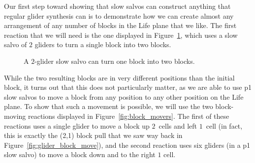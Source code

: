 Our first step toward showing that slow salvos can construct anything that regular glider synthesis can is to demonstrate how we can create almost any arrangement of any number of blocks in the Life plane that we like. The first reaction that we will need is the one displayed in Figure~\ref{fig:slow_salvo_splitter}, which uses a slow salvo of $2$ gliders to turn a single block into two blocks.

\begin{figure}[!htb]
	\centering{}
	\caption{A $2$-glider slow salvo can turn one block into two blocks.}\label{fig:slow_salvo_splitter}
\end{figure}

While the two resulting blocks are in very different positions than the initial block, it turns out that this does not particularly matter, as we are able to use p1 slow salvos to move a block from any position to any other position on the Life plane. To show that such a movement is possible, we will use the two block-moving reactions displayed in Figure~\ref{fig:block_movers}. The first of these reactions uses a single glider to move a block up $2$~cells and left $1$~cell (in fact, this is exactly the (2,1) block pull that we saw way back in Figure~\ref{fig:glider_block_move}), and the second reaction uses six gliders (in a p1 slow salvo) to move a block down and to the right $1$ cell.

